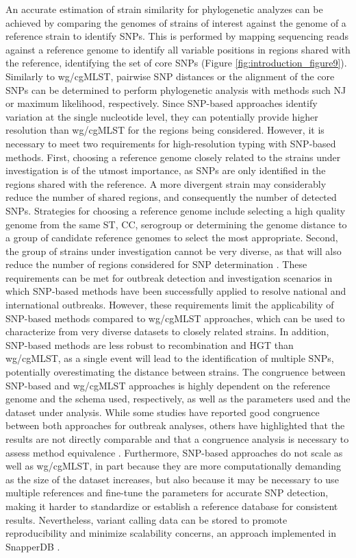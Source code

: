An accurate estimation of strain similarity for phylogenetic analyzes can be achieved by comparing the genomes of strains of interest against the genome of a reference strain to identify \ac{SNPs}. This is performed by mapping sequencing reads against a reference genome to identify all variable positions in regions shared with the reference, identifying the set of core \ac{SNP}s (Figure \ref{fig:introduction_figure9}). Similarly to \ac{wg/cgMLST}, pairwise \ac{SNP} distances or the alignment of the core \ac{SNP}s can be determined to perform phylogenetic analysis with methods such \ac{NJ} or maximum likelihood, respectively. Since \ac{SNP}-based approaches identify variation at the single nucleotide level, they can potentially provide higher resolution than \ac{wg/cgMLST} for the regions being considered. However, it is necessary to meet two requirements for high-resolution typing with \ac{SNP}-based methods. First, choosing a reference genome closely related to the strains under investigation is of the utmost importance, as \ac{SNP}s are only identified in the regions shared with the reference. A more divergent strain may considerably reduce the number of shared regions, and consequently the number of detected \ac{SNP}s. Strategies for choosing a reference genome include selecting a high quality genome from the same \ac{ST}, \ac{CC}, serogroup or determining the genome distance to a group of candidate reference genomes to select the most appropriate. Second, the group of strains under investigation cannot be very diverse, as that will also reduce the number of regions considered for \ac{SNP} determination \cite{jolley_bigsdb_2010}. These requirements can be met for outbreak detection and investigation scenarios in which \ac{SNP}-based methods have been successfully applied to resolve national and international outbreaks. However, these requirements limit the applicability of \ac{SNP}-based methods compared to \ac{wg/cgMLST} approaches, which can be used to characterize from very diverse datasets to closely related strains. In addition, \ac{SNP}-based methods are less robust to recombination and \ac{HGT} than \ac{wg/cgMLST}, as a single event will lead to the identification of multiple \ac{SNP}s, potentially overestimating the distance between strains. The congruence between \ac{SNP}-based and \ac{wg/cgMLST} approaches is highly dependent on the reference genome and the schema used, respectively, as well as the parameters used and the dataset under analysis. While some studies have reported good congruence between both approaches for outbreak analyses, others have highlighted that the results are not directly comparable and that a congruence analysis is necessary to assess method equivalence \cite{mixao_multi-country_2025}. Furthermore, \ac{SNP}-based approaches do not scale as well as \ac{wg/cgMLST}, in part because they are more computationally demanding as the size of the dataset increases, but also because it may be necessary to use multiple references and fine-tune the parameters for accurate \ac{SNP} detection, making it harder to standardize or establish a reference database for consistent results. Nevertheless, variant calling data can be stored to promote reproducibility and minimize scalability concerns, an approach implemented in SnapperDB \cite{dallman_snapperdb_2018}.

